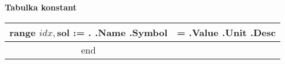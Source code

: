 \documentclass[a4paper,11pt]{article}
\begin{document}
\begin{flushleft}
\sf\large{\textbf{ Tabulka konstant }}
\setlength\itemsep{-1pt}
\begin{longtable}{|c|c|}
{{range $idx, $sol := .}}
  \textbf{ {{.Name}} } {{.Symbol}} & = {{.Value}} {{.Unit}} {{.Desc}}
  \\ \hline
{{end}}
\end{longtable}
\end{flushleft}
\end{document}
